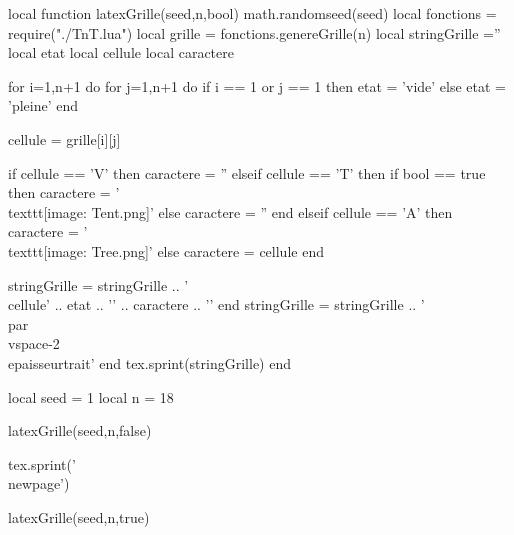 \documentclass{classe-tex3R}
\begin{document}
\begin{luacode*}

local function latexGrille(seed,n,bool)
  math.randomseed(seed)
  local fonctions = require("./TnT.lua")
  local grille = fonctions.genereGrille(n)
  local stringGrille =''
  local etat
  local cellule
  local caractere

  for i=1,n+1 do
    for j=1,n+1 do
      if i == 1 or j == 1 then
        etat = 'vide'
      else
        etat = 'pleine'
      end

      cellule = grille[i][j]

      if cellule == 'V' then
        caractere = ''
      elseif cellule == 'T' then
        if bool == true then
          caractere = '\\texttt{[image: Tent.png]}'
        else
          caractere = ''
        end
      elseif cellule == 'A' then
        caractere = '\\texttt{[image: Tree.png]}'
      else
        caractere = cellule
      end

      stringGrille = stringGrille .. '\\cellule{' .. etat .. '}{' .. caractere .. '}'
    end
      stringGrille = stringGrille .. '\\par\\vspace{-2\\epaisseurtrait}'
  end
  tex.sprint(stringGrille)
end




local seed = 1
local n = 18

latexGrille(seed,n,false)

tex.sprint('\\newpage')

latexGrille(seed,n,true)


\end{luacode*}
\end{document}
